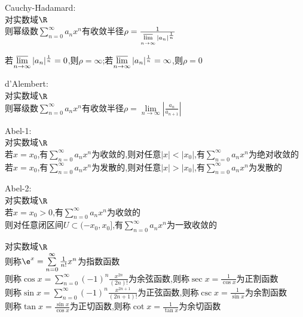 \begin{dingli}
Cauchy-Hadamard:\\
对实数域$\R$\\
则幂级数$\sum\limits_{n=0}^{\infty}a_nx^n$有收敛半径$\rho=\frac{1}{\varlimsup\limits_{n\to\infty}|a_n|^{\frac{1}{n}}}$
\end{dingli}

\begin{zhu}
若$\varlimsup\limits_{n\to\infty}|a_n|^{\frac{1}{n}}=0$,则$\rho=\infty$;若$\varlimsup\limits_{n\to\infty}|a_n|^{\frac{1}{n}}=\infty$,则$\rho=0$
\end{zhu}

\begin{dingli}
d'Alembert:\\
对实数域$\R$\\
则幂级数$\sum\limits_{n=0}^{\infty}a_nx^n$有收敛半径$\rho=\lim\limits_{n\to\infty}|\frac{a_n}{a_{n+1}}|$
\end{dingli}

\begin{dingli}
Abel-1:\\
对实数域$\R$\\
若$x=x_0$,有$\sum\limits_{n=0}^{\infty}a_nx^n$为收敛的,则对任意$|x|<|x_0|$,有$\sum\limits_{n=0}^{\infty}a_nx^n$为绝对收敛的\\
若$x=x_0$,有$\sum\limits_{n=0}^{\infty}a_nx^n$为发散的,则对任意$|x|>|x_0|$,有$\sum\limits_{n=0}^{\infty}a_nx^n$为发散的
\end{dingli}

\begin{dingli}
Abel-2:\\
对实数域$\R$\\
若$x=x_0>0$,有$\sum\limits_{n=0}^{\infty}a_nx^n$为收敛的\\
则对任意闭区间$U\subset(-x_0,x_0]$,有$\sum\limits_{n=0}^{\infty}a_nx^n$为一致收敛的
\end{dingli}

\begin{dingyi}
对实数域$\R$\\
则称$\e^x=\sum\limits_{n=0}^{\infty}\frac{1}{n!}x^n$为指数函数\\
则称$\cos x=\sum\limits_{n=0}^{\infty}(-1)^{n}\frac{x^{2n}}{(2n)!}$为余弦函数,则称$\sec x=\frac{1}{\cos x}$为正割函数\\
则称$\sin x=\sum\limits_{n=0}^{\infty}(-1)^{n}\frac{x^{2n+1}}{(2n+1)!}$为正弦函数,则称$\csc x=\frac{1}{\sin x}$为余割函数\\
则称$\tan x=\frac{\sin x}{\cos x}$为正切函数,则称$\cot x=\frac{1}{\tan x}$为余切函数
\end{dingyi}

